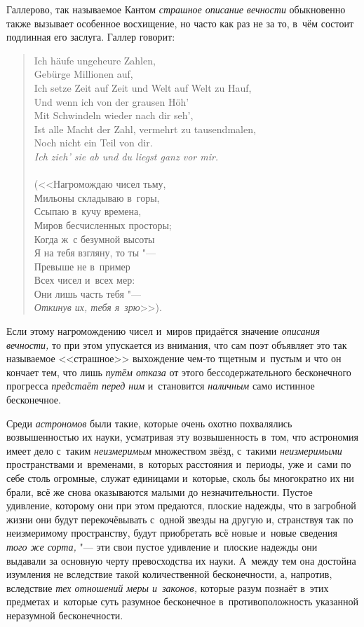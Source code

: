 Галлерово, так называемое Кантом {\em страшное описание вечности} обыкновенно
также вызывает особенное восхищение, но часто как раз не за то, в~чём состоит
подлинная его заслуга. Галлер говорит:

\begin{verse}{\footnotesize
Ich häufe ungeheure Zahlen, \\
Gebürge Millionen auf, \\
Ich setze Zeit auf Zeit und Welt auf Welt zu Hauf, \\
Und wenn ich von der grausen Höh' \\
Mit Schwindeln wieder nach dir seh', \\
Ist alle Macht der Zahl, vermehrt zu tausendmalen, \\
Noch nicht ein Teil von dir. \\
{\em Ich zieh' sie ab und du liegst ganz vor mir.} \\
\ \\}
(<<Нагромождаю чисел тьму, \\
Мильоны складываю в~горы, \\
Ссыпаю в~кучу времена, \\
Миров бесчисленных просторы; \\
Когда ж~с безумной высоты \\
Я на тебя взгляну, то ты "--- \\
Превыше не в~пример \\
Всех чисел и~всех мер: \\
Они лишь часть тебя "--- \\
{\em Откинув их, тебя я~зрю}>>).
\end{verse}

Если этому нагромождению чисел и~миров придаётся значение
{\em описания вечности,} то при этом упускается из внимания, что сам поэт
объявляет это так называемое <<страшное>> выхождение чем-то тщетным и~пустым и
что он кончает тем, что лишь {\em путём отказа} от этого бессодержательного
бесконечного прогресса {\em предстаёт перед ним} и~становится {\em наличным}
само истинное бесконечное.

Среди {\em астрономов} были такие, которые очень охотно похвалялись
возвышенностью их науки, усматривая эту возвышенность в~том, что астрономия
имеет дело с~таким {\em неизмеримым} множеством звёзд, с~такими
{\em неизмеримыми} пространствами и~временами, в~которых расстояния и~периоды,
уже и~сами по себе столь огромные, служат единицами и~которые, сколь бы
многократно их ни брали, всё же снова оказываются малыми до незначительности.
Пустое удивление, которому они при этом предаются, плоские надежды, что в
загробной жизни они будут перекочёвывать с~одной звезды на другую и, странствуя
так по неизмеримому пространству, будут приобретать всё новые и~новые сведения
{\em того же сорта,} "--- эти свои пустое удивление и~плоские надежды они
выдавали за основную черту превосходства их науки. А~между тем она достойна
изумления не вследствие такой количественной бесконечности, а, напротив,
вследствие {\em тех отношений меры и~законов,} которые разум познаёт в~этих
предметах и~которые суть разумное бесконечное в~противоположность указанной
неразумной бесконечности.

